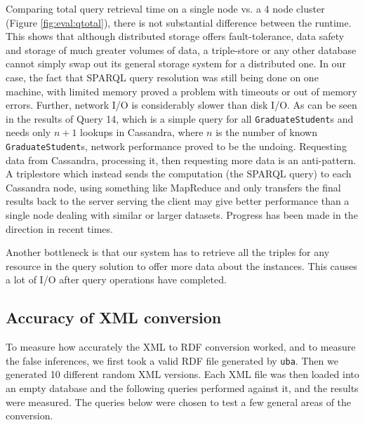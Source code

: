 \documentclass[journal]{IEEEtran}
\begin{document}
Comparing total query retrieval time on a single node vs. a 4 node cluster
(Figure \ref{fig:eval:qtotal}), there is not substantial difference between the
runtime. This shows that although distributed storage offers fault-tolerance,
data safety and storage of much greater volumes of data, a triple-store or any
other database cannot simply swap out its general storage system for
a distributed one. In our case, the fact that SPARQL query resolution was still
being done on one machine, with limited memory proved a problem with timeouts
or out of memory errors. Further, network I/O is considerably slower than disk
I/O. As can be seen in the results of Query 14, which is a simple query for all
\texttt{GraduateStudent}s and needs only $n+1$ lookups in Cassandra, where $n$
is the number of known \texttt{GraduateStudent}s, network performance proved to
be the undoing.  Requesting data from Cassandra, processing it, then requesting
more data is an anti-pattern. A triplestore which instead sends the computation
(the SPARQL query) to each Cassandra node, using something like
MapReduce\cite{Dean04mapreduce:simplified} and only transfers the final results
back to the server serving the client may give better performance than a single
node dealing with similar or larger datasets. Progress has been made in the
direction in recent times\cite{myung10spa}\cite{hus09hadoop}.

Another bottleneck is that our system has to retrieve all the triples for any
resource in the query solution to offer more data about the instances. This
causes a lot of I/O after query operations have completed.

\subsection{Accuracy of XML conversion}

To measure how accurately the XML to RDF conversion worked, and to measure the
false inferences, we first took a valid RDF file generated by \texttt{uba}.
Then we generated 10 different random XML versions. Each XML file was then
loaded into an empty database and the following queries performed against it,
and the results were measured. The queries below were chosen to test a few
general areas of the conversion.
\end{document}
